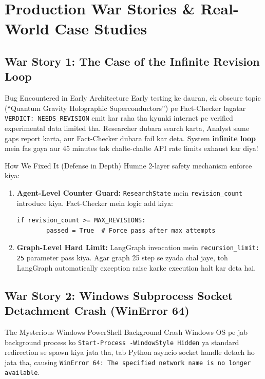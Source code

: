 \documentclass[11pt,a4paper,twoside]{report}
\begin{document}
\chapter{Production War Stories \& Real-World Case Studies}

\section{War Story 1: The Case of the Infinite Revision Loop}

\begin{dangerbox}{Bug Encountered in Early Architecture}
Early testing ke dauran, ek obscure topic (``Quantum Gravity Holographic Superconductors'') pe Fact-Checker lagatar \texttt{VERDICT: NEEDS\_REVISION} emit kar raha tha kyunki internet pe verified experimental data limited tha.
Researcher dubara search karta, Analyst same gaps report karta, aur Fact-Checker dubara fail kar deta.
System \textbf{infinite loop} mein fas gaya aur 45 minutes tak chalte-chalte API rate limits exhaust kar diya!
\end{dangerbox}

\begin{storybox}{How We Fixed It (Defense in Depth)}
Humne 2-layer safety mechanism enforce kiya:
\begin{enumerate}
    \item \textbf{Agent-Level Counter Guard:} \texttt{ResearchState} mein \texttt{revision\_count} introduce kiya. Fact-Checker mein logic add kiya:
    \begin{lstlisting}[style=pythonstyle]
    if revision_count >= MAX_REVISIONS:
        passed = True  # Force pass after max attempts
    \end{lstlisting}
    \item \textbf{Graph-Level Hard Limit:} LangGraph invocation mein \texttt{recursion\_limit: 25} parameter pass kiya. Agar graph 25 step se zyada chal jaye, toh LangGraph automatically exception raise karke execution halt kar deta hai.
\end{enumerate}
\end{storybox}

\section{War Story 2: Windows Subprocess Socket Detachment Crash (WinError 64)}

\begin{warningbox}{The Mysterious Windows PowerShell Background Crash}
Windows OS pe jab background process ko \texttt{Start-Process -WindowStyle Hidden} ya standard redirection se spawn kiya jata tha, tab Python asyncio socket handle detach ho jata tha, causing \texttt{WinError 64: The specified network name is no longer available}.
\end{warningbox}
\end{document}
